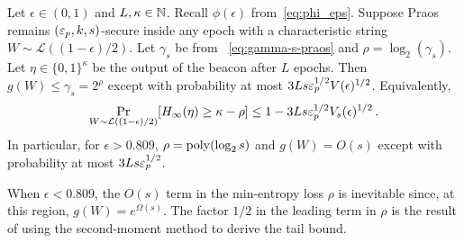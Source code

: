 

\begin{theorem}\label{thm:minentropy-loss-praos-multi-epochs}  
  Let $\epsilon \in (0, 1)$ and $L,\kappa \in \mathbb{N}$. 
  Recall $\phi(\epsilon)$ from~\eqref{eq:phi_eps}.
  Suppose Praos 
  remains $(\mathsf{\varepsilon}_p, k, s)$-secure 
  inside any epoch 
  with a characteristic string $W \sim \mathcal{L}((1-\epsilon)/2)$. 
  Let $\gamma_s$ be from ~\eqref{eq:gamma-s-praos} and 
  $\rho = \log_2(\gamma_s)$. 
  Let $\eta \in \{0,1\}^\kappa$ be the output of the beacon after $L$ epochs.
  Then $g(W) \leq \gamma_s = 2^\rho$ except with probability at most $3 L s \mathsf{\varepsilon}_p^{1/2} V(\epsilon)^{1/2}$.
  Equivalently,
  $$
    \Pr_{W \sim \mathcal{L}((1-\epsilon)/2)}[H_\infty(\eta) \geq \kappa - \rho] 
      \leq 1 - 3 L s \mathsf{\varepsilon}_p^{1/2} V_s(\epsilon)^{1/2} \,.
  $$
  In particular, for $\epsilon > 0.809$, 
  $\rho = \mathrm{poly}(\log_2 s)$ and $g(W) = O(s)$ 
  except with probability at most $3 L s \mathsf{\varepsilon}_p^{1/2}$.
\end{theorem}

\begin{remark*}
  When $\epsilon < 0.809$, 
  the $O(s)$ term in the min-entropy loss $\rho$ 
  is inevitable since, at this region, 
  $g(W) = e^{\Omega(s)}$.
  The factor $1/2$ in the leading term in $\rho$ 
  is the result of using the second-moment method 
  to derive the tail bound.
\end{remark*}

